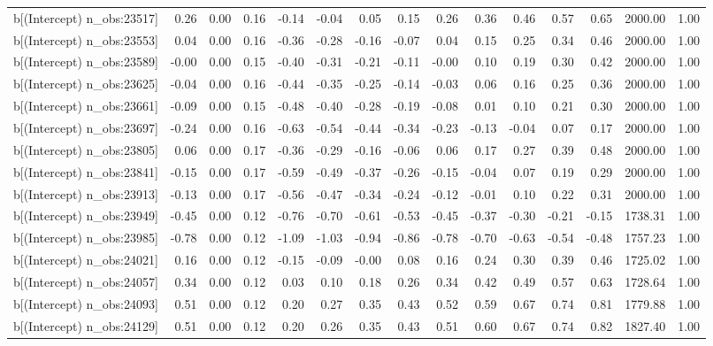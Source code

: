 \begin{table}[ht]
\begin{tabular}{rrrrrrrrrrrrrrr}
  b[(Intercept) n\_obs:23517] & 0.26 & 0.00 & 0.16 & -0.14 & -0.04 & 0.05 & 0.15 & 0.26 & 0.36 & 0.46 & 0.57 & 0.65 & 2000.00 & 1.00 \\ 
  b[(Intercept) n\_obs:23553] & 0.04 & 0.00 & 0.16 & -0.36 & -0.28 & -0.16 & -0.07 & 0.04 & 0.15 & 0.25 & 0.34 & 0.46 & 2000.00 & 1.00 \\ 
  b[(Intercept) n\_obs:23589] & -0.00 & 0.00 & 0.15 & -0.40 & -0.31 & -0.21 & -0.11 & -0.00 & 0.10 & 0.19 & 0.30 & 0.42 & 2000.00 & 1.00 \\ 
  b[(Intercept) n\_obs:23625] & -0.04 & 0.00 & 0.16 & -0.44 & -0.35 & -0.25 & -0.14 & -0.03 & 0.06 & 0.16 & 0.25 & 0.36 & 2000.00 & 1.00 \\ 
  b[(Intercept) n\_obs:23661] & -0.09 & 0.00 & 0.15 & -0.48 & -0.40 & -0.28 & -0.19 & -0.08 & 0.01 & 0.10 & 0.21 & 0.30 & 2000.00 & 1.00 \\ 
  b[(Intercept) n\_obs:23697] & -0.24 & 0.00 & 0.16 & -0.63 & -0.54 & -0.44 & -0.34 & -0.23 & -0.13 & -0.04 & 0.07 & 0.17 & 2000.00 & 1.00 \\ 
  b[(Intercept) n\_obs:23805] & 0.06 & 0.00 & 0.17 & -0.36 & -0.29 & -0.16 & -0.06 & 0.06 & 0.17 & 0.27 & 0.39 & 0.48 & 2000.00 & 1.00 \\ 
  b[(Intercept) n\_obs:23841] & -0.15 & 0.00 & 0.17 & -0.59 & -0.49 & -0.37 & -0.26 & -0.15 & -0.04 & 0.07 & 0.19 & 0.29 & 2000.00 & 1.00 \\ 
  b[(Intercept) n\_obs:23913] & -0.13 & 0.00 & 0.17 & -0.56 & -0.47 & -0.34 & -0.24 & -0.12 & -0.01 & 0.10 & 0.22 & 0.31 & 2000.00 & 1.00 \\ 
  b[(Intercept) n\_obs:23949] & -0.45 & 0.00 & 0.12 & -0.76 & -0.70 & -0.61 & -0.53 & -0.45 & -0.37 & -0.30 & -0.21 & -0.15 & 1738.31 & 1.00 \\ 
  b[(Intercept) n\_obs:23985] & -0.78 & 0.00 & 0.12 & -1.09 & -1.03 & -0.94 & -0.86 & -0.78 & -0.70 & -0.63 & -0.54 & -0.48 & 1757.23 & 1.00 \\ 
  b[(Intercept) n\_obs:24021] & 0.16 & 0.00 & 0.12 & -0.15 & -0.09 & -0.00 & 0.08 & 0.16 & 0.24 & 0.30 & 0.39 & 0.46 & 1725.02 & 1.00 \\ 
  b[(Intercept) n\_obs:24057] & 0.34 & 0.00 & 0.12 & 0.03 & 0.10 & 0.18 & 0.26 & 0.34 & 0.42 & 0.49 & 0.57 & 0.63 & 1728.64 & 1.00 \\ 
  b[(Intercept) n\_obs:24093] & 0.51 & 0.00 & 0.12 & 0.20 & 0.27 & 0.35 & 0.43 & 0.52 & 0.59 & 0.67 & 0.74 & 0.81 & 1779.88 & 1.00 \\ 
  b[(Intercept) n\_obs:24129] & 0.51 & 0.00 & 0.12 & 0.20 & 0.26 & 0.35 & 0.43 & 0.51 & 0.60 & 0.67 & 0.74 & 0.82 & 1827.40 & 1.00 \\ 

\end{tabular}
\end{table}
